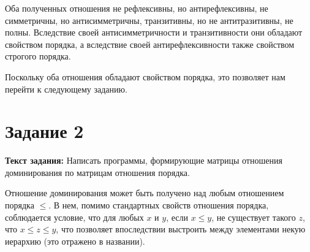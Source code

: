 \documentclass[12pt]{article}
\begin{document}
	\newpage
	
	\begin{figure}[bh]
		\noindent{}
	\end{figure}
	
	\begin{figure}[bh]
		\noindent{}
	\end{figure}
	
	Оба полученных отношения не рефлексивны, но антирефлексивны, не симметричны, но антисимметричны, транзитивны, но не антитразитивны, не полны. Вследствие своей антисимметричности и транзитивности они обладают свойством порядка, а вследствие своей антирефлексивности также свойством строгого порядка.
	
	Поскольку оба отношения обладают свойством порядка, это позволяет нам перейти к следующему заданию.
	
	\section{Задание 2}
	\label{task2}
	
	{\bf Текст задания:} Написать программы, формирующие матрицы отношения доминирования по матрицам отношения порядка. 
	
	Отношение доминирования может быть получено над любым отношением порядка $\le$. В нем, помимо стандартных свойств отношения порядка, соблюдается условие, что для любых $x$ и $y$, если $x \le y$, не существует такого $z$, что $x \le z \le y$, что позволяет впоследствии выстроить между элементами некую иерархию (это отражено в названии).
	
\end{document}
